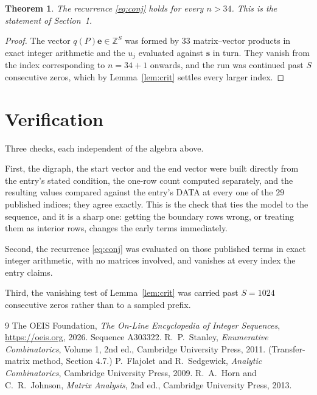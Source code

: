 \documentclass[11pt,a4paper]{article}
\theoremstyle{plain}
\newtheorem{theorem}{Theorem}
\theoremstyle{definition}
\begin{document}
\begin{theorem}
The recurrence \eqref{eq:conj} holds for every $n>34$. This is the statement of
Section~1.
\end{theorem}

\begin{proof}
The vector $q(P)\mathbf{e}\in\mathbb{Z}^{S}$ was formed by $33$ matrix--vector
products in exact integer arithmetic and the $u_j$ evaluated against $\mathbf{s}$ in turn.
They vanish from the index corresponding to $n=34+1$ onwards, and the run was continued
past $S$ consecutive zeros, which by Lemma~\ref{lem:crit} settles every larger index.
\end{proof}

\section{Verification}

Three checks, each independent of the algebra above.

First, the digraph, the start vector and the end vector were built directly from the
entry's stated condition, the one-row count computed separately, and the resulting values
compared against the entry's DATA at every one of the $29$ published indices; they
agree exactly. This is the check that ties the model to the sequence, and it is a sharp one:
getting the boundary rows wrong, or treating them as interior rows, changes the early terms
immediately.

Second, the recurrence \eqref{eq:conj} was evaluated on those published terms in exact
integer arithmetic, with no matrices involved, and vanishes at every index the entry claims.

Third, the vanishing test of Lemma~\ref{lem:crit} was carried past $S=1024$ consecutive
zeros rather than to a sampled prefix.

\begin{thebibliography}{9}
 The OEIS Foundation, \emph{The On-Line Encyclopedia of Integer
Sequences}, \url{https://oeis.org}, 2026. Sequence A303322.
 R.~P.~Stanley, \emph{Enumerative Combinatorics}, Volume 1, 2nd ed.,
Cambridge University Press, 2011. (Transfer-matrix method, Section 4.7.)
 P.~Flajolet and R.~Sedgewick, \emph{Analytic Combinatorics}, Cambridge
University Press, 2009.
 R.~A.~Horn and C.~R.~Johnson, \emph{Matrix Analysis}, 2nd ed., Cambridge
University Press, 2013.
\end{thebibliography}
\end{document}
